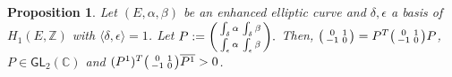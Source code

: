 \documentclass{article}
\numberwithin{equation}{section}
\numberwithin{figure}{section}
\theoremstyle{plain}
\newtheorem{proposition}[theorem]{Proposition}
\theoremstyle{definition}
\numberwithin{equation}{section}
\newtheorem[S, bodystyle=\normalfont\noindent]{defiS}{Definition}[section]
\begin{document}
\begin{proposition}
Let $(E,\alpha,\beta)$ be an enhanced elliptic curve and $\delta,\epsilon$ a basis of $H_1(E,\mathbb{Z})$ with $\langle \delta,\epsilon\rangle=1$. Let $P:=\begin{psmallmatrix}\int_{\delta}\alpha & \int_{\delta}\beta\\\int_{\epsilon}\alpha & \int_{\epsilon}\beta\end{psmallmatrix}.$  Then, $\begin{psmallmatrix} 0 & 1 \\ -1& 0\end{psmallmatrix}=P^T\begin{psmallmatrix} 0 & 1 \\ -1& 0\end{psmallmatrix}P$, $P\in \mathsf{GL}_2(\mathbb{C})$ and $(P^1)^T\begin{psmallmatrix} 0 & 1 \\ -1& 0\end{psmallmatrix}\overline{P^1}>0$.
\end{proposition}
\end{document}
